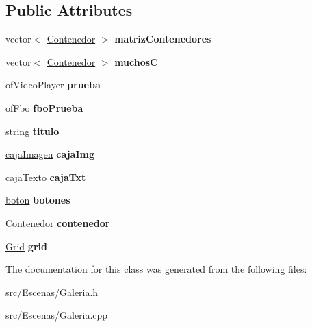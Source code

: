 \subsection*{Public Attributes}
\begin{DoxyCompactItemize}
\item 
\hypertarget{class_galeria_ab6704f680318d3df3327b0f90b26d771}{}vector$<$ \hyperlink{class_contenedor}{Contenedor} $>$ {\bfseries matriz\+Contenedores}\label{class_galeria_ab6704f680318d3df3327b0f90b26d771}

\item 
\hypertarget{class_galeria_aa79226bf7f5b27182ab943482be30b92}{}vector$<$ \hyperlink{class_contenedor}{Contenedor} $>$ {\bfseries muchos\+C}\label{class_galeria_aa79226bf7f5b27182ab943482be30b92}

\item 
\hypertarget{class_galeria_addda29aae08af2b3b4ba020d79f004df}{}of\+Video\+Player {\bfseries prueba}\label{class_galeria_addda29aae08af2b3b4ba020d79f004df}

\item 
\hypertarget{class_galeria_afacbab028036dee53bead80f60a882f4}{}of\+Fbo {\bfseries fbo\+Prueba}\label{class_galeria_afacbab028036dee53bead80f60a882f4}

\item 
\hypertarget{class_galeria_a23d00ea327a297143419119a7c526b35}{}string {\bfseries titulo}\label{class_galeria_a23d00ea327a297143419119a7c526b35}

\item 
\hypertarget{class_galeria_aeeb7a09d0f0967cb0493c08be370d934}{}\hyperlink{classcaja_imagen}{caja\+Imagen} {\bfseries caja\+Img}\label{class_galeria_aeeb7a09d0f0967cb0493c08be370d934}

\item 
\hypertarget{class_galeria_a1fd8d0d20bc2ec7eab6db4d5d9cca763}{}\hyperlink{classcaja_texto}{caja\+Texto} {\bfseries caja\+Txt}\label{class_galeria_a1fd8d0d20bc2ec7eab6db4d5d9cca763}

\item 
\hypertarget{class_galeria_af07d1848a2ae2b41f0cd76e086702c2f}{}\hyperlink{classboton}{boton} {\bfseries botones}\label{class_galeria_af07d1848a2ae2b41f0cd76e086702c2f}

\item 
\hypertarget{class_galeria_a34eeff9236213cca2603bce33963c493}{}\hyperlink{class_contenedor}{Contenedor} {\bfseries contenedor}\label{class_galeria_a34eeff9236213cca2603bce33963c493}

\item 
\hypertarget{class_galeria_a8fe22b3ed01742374a98c31b8a59e69e}{}\hyperlink{class_grid}{Grid} {\bfseries grid}\label{class_galeria_a8fe22b3ed01742374a98c31b8a59e69e}

\end{DoxyCompactItemize}


The documentation for this class was generated from the following files\+:\begin{DoxyCompactItemize}
\item 
src/\+Escenas/Galeria.\+h\item 
src/\+Escenas/Galeria.\+cpp\end{DoxyCompactItemize}
